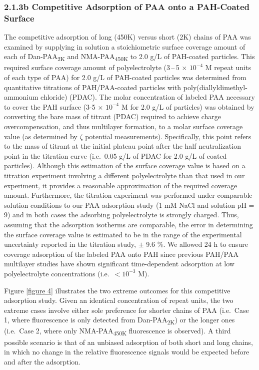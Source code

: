 \documentclass[journal=mamobx,manuscript=article]{achemso}
\begin{document}
\subsubsection{2.1.3b Competitive Adsorption of PAA onto a PAH-Coated Surface}    %
    \label{sec-exp-compet}

The competitive adsorption of long (450K) versus short (2K) chains of PAA was examined by supplying in solution a stoichiometric surface coverage amount of each of Dan-PAA\textsubscript{2K} and NMA-PAA\textsubscript{450K} to 2.0 g/L of PAH-coated particles.  This required surface coverage amount of polyelectrolyte (3\,--\,5$\,\times \,10^{-4}$ M repeat units of each type of PAA) for 2.0 g/L of PAH-coated particles was determined from quantitative titrations of PAH/PAA-coated particles with poly(diallyldimethyl-ammonium chloride) (PDAC).\cite{Burke2003}   The molar concentration of labeled PAA necessary to cover the PAH surface (3-5 $\times$ $10^{-4}$ M for 2.0 g/L of particles) was obtained by converting the bare mass of titrant (PDAC) required to achieve charge overcompensation, and thus multilayer formation, to a molar surface coverage value (as determined by $\zeta$ potential measurements).\cite{Burke2003}   Specifically, this point refers to the mass of titrant at the initial plateau point after the half neutralization point in the titration curve (i.e.\ 0.05 g/L of PDAC for 2.0 g/L of coated particles).  Although this estimation of the surface coverage value is based on a titration experiment involving a different polyelectrolyte than that used in our experiment, it provides a reasonable approximation of the required coverage amount.  Furthermore, the titration experiment was performed under comparable solution conditions to our PAA adsorption study (1 mM NaCl and solution pH = 9) and in both cases the adsorbing polyelectrolyte is strongly charged.  Thus, assuming that the adsorption isotherms are comparable, the error in determining the surface coverage value is estimated to be in the range of the experimental uncertainty reported in the titration study, $\pm$ 9.6 \%.  We allowed 24 h to ensure coverage adsorption of the labeled PAA onto PAH since previous PAH/PAA multilayer studies have shown significant time-dependent adsorption at low polyelectrolyte concentrations (i.e.\ $<10^{-3}$ M).\cite{Mermut2003}

Figure \ref{figure 4} illustrates the two extreme outcomes for this competitive adsorption study.  Given an identical concentration of repeat units, the two extreme cases involve either sole preference for shorter chains of PAA (i.e.\ Case 1, where fluorescence is only detected from Dan-PAA\textsubscript{2K}) or the longer ones (i.e.\ Case 2, where only NMA-PAA\textsubscript{450K} fluorescence is observed).  A third possible scenario is that of an unbiased adsorption of both short and long chains, in which no change in the relative fluorescence signals would be expected before and after the adsorption. 
\end{document}
